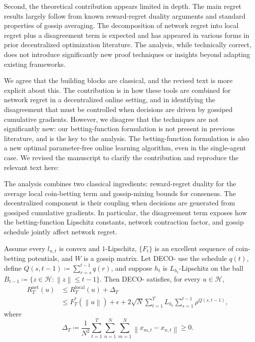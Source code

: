 \documentclass[12pt,english]{reviewresponse}
\newcommand{\norm}[1]{\left\lVert#1\right\rVert}
\newcommand{\algname}{{DECO}\xspace}
\newcommand{\Hil}{\mathcal{H}}
\begin{document}
\begin{revcomment}
    Second, the theoretical contribution appears limited in depth. The main regret results largely follow from known reward-regret duality arguments and standard properties of gossip averaging. The decomposition of network regret into local regret plus a disagreement term is expected and has appeared in various forms in prior decentralized optimization literature. The analysis, while technically correct, does not introduce significantly new proof techniques or insights beyond adapting existing frameworks.
\end{revcomment}
\begin{revresponse}
    We agree that the building blocks are classical, and the revised text is more explicit about this.  The contribution is in how these tools are combined for network regret in a decentralized online setting, and in identifying the disagreement that must be controlled when decisions are driven by gossiped cumulative gradients.  %
    However, we disagree that the techniques are not significantly new: our betting-function formulation is not present in previous literature, and is the key to the analysis.
    The betting-function formulation is also a new optimal parameter-free online learning algorithm, even in the single-agent case.
    We revised the manuscript to clarify the contribution %
    and reproduce the relevant text here:
    \begin{changes}
        The analysis combines two classical ingredients: reward-regret duality for the average local coin-betting term and gossip-mixing bounds for consensus.
        The decentralized component is their coupling when decisions are generated from gossiped cumulative gradients.
        In particular, the disagreement term exposes how the betting-function Lipschitz constants, network contraction factor, and gossip schedule jointly affect network regret.

        Assume every $l_{n,t}$ is convex and $1$-Lipschitz, $\{F_t\}$ is an excellent sequence of coin-betting potentials, and $W$ is a gossip matrix. Let \algname{}- use the schedule $q(t)$, define $Q(s,t-1)\coloneqq\sum_{r=s}^{t-1}q(r)$, and suppose $h_t$ is $L_{h_t}$-Lipschitz on the ball
        $B_{t-1}\coloneqq\{z\in\Hil:\norm{z}\leq t-1\}$.
        Then \algname{}- satisfies, for every $u\in\Hil$,
        \begin{align*}
            R_T^{\mathrm{net}}(u)
             & \leq R_T^{\mathrm{local}}(u)+\Delta_T \\
             & \leq F_T^*(\norm{u})+\epsilon
            +2\sqrt{N}\sum_{t=1}^T L_{h_t}
            \sum_{s=1}^{t-1}\rho^{Q(s,t-1)},
        \end{align*}
        where
        \begin{equation*}
            \Delta_T\coloneqq\frac{1}{N^2}
            \sum_{t=1}^T\sum_{n=1}^N\sum_{m=1}^N
            \norm{x_{m,t}-x_{n,t}}\geq0.
        \end{equation*}


\end{changes}
\end{revresponse}
\end{document}

